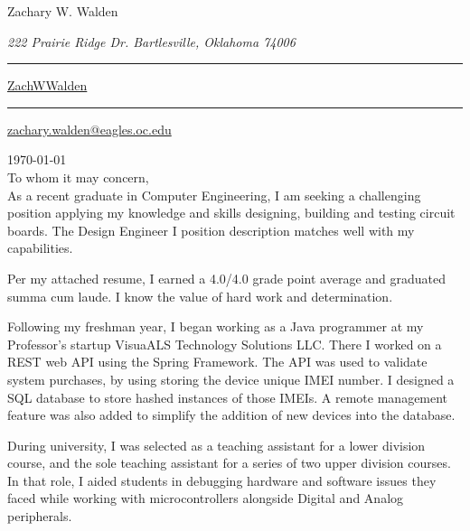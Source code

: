 \documentclass{article}
\newcommand\mybar{\kern1pt\rule[-\dp\strutbox]{.8pt}{\baselineskip}\kern1pt}
\begin{document}
\begin{center}
	\begin{Huge}
		Zachary W. Walden\\
	\end{Huge}
	\begin{large}
		\textsl{222 Prairie Ridge Dr. Bartlesville, Oklahoma 74006}\\
	\end{large}
	\begin{normalsize}
		 \mybar { } \faGithub \href{https://github.com/ZachWWalden}{ ZachWWalden}
		\mybar { }\faEnvelope\href{mailto::zachary.walden@eagles.oc.edu}{ zachary.walden@eagles.oc.edu}
	\end{normalsize}
\end{center}

\begin{adjustwidth}{70pt}{70pt}
\begin{spacing}{1.25}
\vspace*{\fill}

\today
\\To whom it may concern,\\

As a recent graduate in Computer Engineering, I am seeking a challenging position applying my knowledge
and  skills designing, building and testing circuit boards. The Design Engineer I position description
matches well with my capabilities.

Per my attached resume, I earned a 4.0/4.0 grade point average and graduated summa cum laude. I know the value of hard
work and determination.

Following my freshman year, I began working as a Java programmer at my Professor's startup VisuaALS Technology Solutions LLC. There I worked on a REST web API using the Spring Framework. The API was used to validate system purchases, by using storing the device unique IMEI number. I designed a SQL database to store hashed instances of those IMEIs. A remote management feature was also added to simplify the addition of new devices into the database.

During university, I was selected as a teaching assistant for a lower division course, and the sole teaching assistant for a series of two upper division courses.
In that role, I aided students in debugging hardware and software issues they faced while working with microcontrollers alongside Digital and Analog peripherals.


\end{spacing}
\end{adjustwidth}
\end{document}
